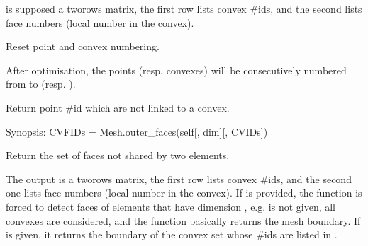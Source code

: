 \documentclass[a4paper,11pt,english]{sphinxmanual}
\begin{document}
\begin{fulllineitems}
\begin{fulllineitems}
 is supposed a two\sphinxhyphen{}rows matrix, the first row lists convex
\#ids, and the second lists face numbers (local number in the convex).

\end{fulllineitems}


\begin{fulllineitems}
\label{\detokenize{python/cmdref_Mesh:getfem.Mesh.optimize_structure}}
Reset point and convex numbering.

After optimisation, the points (resp. convexes) will
be consecutively numbered from  to
 (resp. ).

\end{fulllineitems}


\begin{fulllineitems}
\label{\detokenize{python/cmdref_Mesh:getfem.Mesh.orphaned_pid}}
Return point \#id which are not linked to a convex.

\end{fulllineitems}


\begin{fulllineitems}
\label{\detokenize{python/cmdref_Mesh:getfem.Mesh.outer_faces}}
Synopsis: CVFIDs = Mesh.outer\_faces(self{[}, dim{]}{[}, CVIDs{]})

Return the set of faces not shared by two elements.

The output  is a two\sphinxhyphen{}rows matrix, the first row lists
convex \#ids, and the second one lists face numbers (local number
in the convex). If  is provided, the function is forced to
detect faces of elements that have dimension , e.g.  is not given, all convexes are considered, and the
function basically returns the mesh boundary. If 
is given, it returns the boundary of the convex set whose \#ids are
listed in .


\end{fulllineitems}
\end{fulllineitems}
\end{document}
